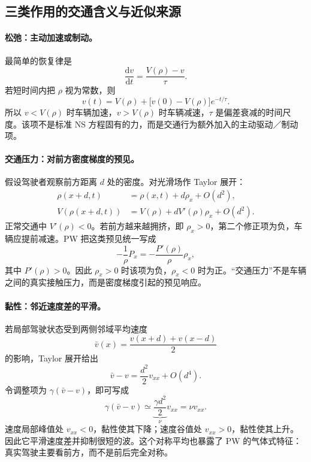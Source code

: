 \documentclass[11pt,a4paper,openany]{book}
\numberwithin{equation}{chapter}
\numberwithin{figure}{chapter}
\numberwithin{table}{chapter}
\begin{document}
\subsection{三类作用的交通含义与近似来源}

\paragraph{松弛：主动加速或制动。}
最简单的恢复律是
\begin{equation}
\frac{\mathrm dv}{\mathrm dt}
=\frac{V(\rho)-v}{\tau}.
\label{eq:pw-relaxation-alone}
\end{equation}
若短时间内把 $\rho$ 视为常数，则
\begin{equation}
v(t)=V(\rho)+\bigl[v(0)-V(\rho)\bigr]e^{-t/\tau}.
\end{equation}
所以 $v<V(\rho)$ 时车辆加速，$v>V(\rho)$ 时车辆减速，$\tau$ 是偏差衰减的时间尺度。该项不是标准 NS 方程固有的力，而是交通行为额外加入的主动驱动／制动项。

\paragraph{交通压力：对前方密度梯度的预见。}
假设驾驶者观察前方距离 $d$ 处的密度。对光滑场作 Taylor 展开：
\begin{align}
\rho(x+d,t)
&=\rho(x,t)+d\rho_x+O(d^2),\\
V\!\left(\rho(x+d,t)\right)
&=V(\rho)+dV'(\rho)\rho_x+O(d^2).
\end{align}
正常交通中 $V'(\rho)<0$。若前方越来越拥挤，即 $\rho_x>0$，第二个修正项为负，车辆应提前减速。PW 把这类预见统一写成
\begin{equation}
-\frac{1}{\rho}P_x
=-\frac{P'(\rho)}{\rho}\rho_x,
\label{eq:pw-pressure-chain}
\end{equation}
其中 $P'(\rho)>0$。因此 $\rho_x>0$ 时该项为负，$\rho_x<0$ 时为正。“交通压力”不是车辆之间的真实接触压力，而是密度梯度引起的预见响应。

\paragraph{黏性：邻近速度差的平滑。}
若局部驾驶状态受到两侧邻域平均速度
\begin{equation}
\bar v(x)=\frac{v(x+d)+v(x-d)}{2}
\end{equation}
的影响，Taylor 展开给出
\begin{equation}
\bar v-v
=\frac{d^2}{2}v_{xx}+O(d^4).
\end{equation}
令调整项为 $\gamma(\bar v-v)$，即可写成
\begin{equation}
\gamma(\bar v-v)\simeq
\underbrace{\frac{\gamma d^2}{2}}_{\nu}v_{xx}
=\nu v_{xx}.
\label{eq:pw-viscosity-average}
\end{equation}
速度局部峰值处 $v_{xx}<0$，黏性使其下降；速度谷值处 $v_{xx}>0$，黏性使其上升。因此它平滑速度差并抑制很短的波。这个对称平均也暴露了 PW 的气体式特征：真实驾驶主要看前方，而不是前后完全对称。
\end{document}
